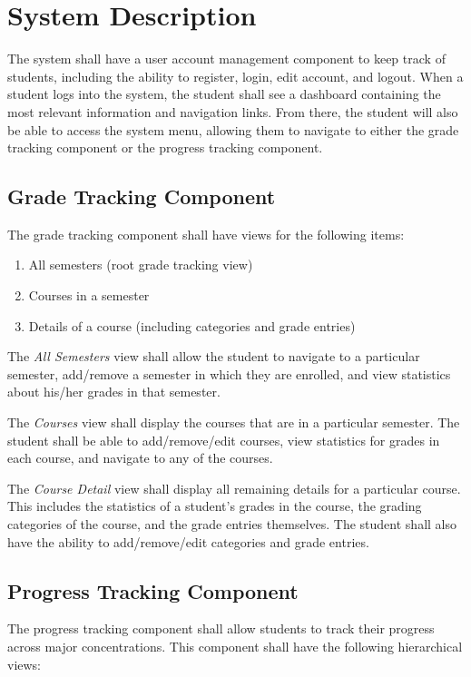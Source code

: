 \documentclass[12pt]{article}
\begin{document}
\section{System Description}
The system shall have a user account management component to keep track of students, including the
ability to register, login, edit account, and logout. When a student logs into the system, the
student shall see a dashboard containing the most relevant information and navigation links. From
there, the student will also be able to access the system menu, allowing them to navigate to either
the grade tracking component or the progress tracking component.

\subsection{Grade Tracking Component}
\noindent
The grade tracking component shall have views for the following items:

\begin{enumerate}
    \item All semesters (root grade tracking view)
    \item Courses in a semester
    \item Details of a course (including categories and grade entries)
\end{enumerate}

The \textit{All Semesters} view shall allow the student to navigate to a particular semester,
add/remove a semester in which they are enrolled, and view statistics about his/her grades in that
semester.

The \textit{Courses} view shall display the courses that are in a particular semester. The student
shall be able to add/remove/edit courses, view statistics for grades in each course, and navigate
to any of the courses.

The \textit{Course Detail} view shall display all remaining details for a particular course. This
includes the statistics of a student's grades in the course, the grading categories of the course,
and the grade entries themselves. The student shall also have the ability to add/remove/edit
categories and grade entries.

\subsection{Progress Tracking Component}
\noindent
The progress tracking component shall allow students to track their progress across major
concentrations. This component shall have the following hierarchical views:
\end{document}
